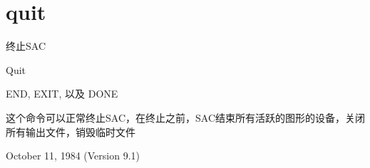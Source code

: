\section{quit}
\label{cmd:quit}

终止SAC

Quit

END, EXIT, 以及 DONE 

这个命令可以正常终止SAC，在终止之前，SAC结束所有活跃的图形的设备，关闭所有输出文件，销毁临时文件

October 11, 1984 (Version 9.1)


